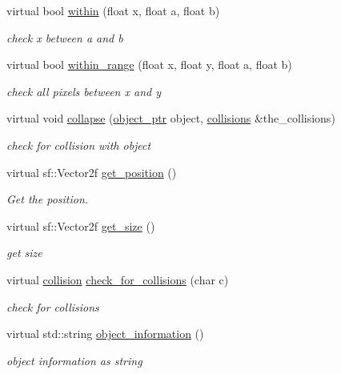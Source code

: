 \begin{DoxyCompactItemize}
virtual bool \hyperlink{classdrawable_a0d3278e4e888fc8289468e8893dd8329}{within} (float x, float a, float b)
\begin{DoxyCompactList}\small\item\em check x between a and b \end{DoxyCompactList}\item 
virtual bool \hyperlink{classdrawable_ab5c0e1af885f214bc9ef0da47cdb5ac9}{within\+\_\+range} (float x, float y, float a, float b)
\begin{DoxyCompactList}\small\item\em check all pixels between x and y \end{DoxyCompactList}\item 
virtual void \hyperlink{classdrawable_af0ddd3660d258629598dc76b31d1cc49}{collapse} (\hyperlink{typedefs_8hpp_aab5add95f06d2ba25dbfed8eb07274fa}{object\+\_\+ptr} object, \hyperlink{typedefs_8hpp_a7e1a7f34f6d09dabb4cdafd6e4118603}{collisions} \&the\+\_\+collisions)
\begin{DoxyCompactList}\small\item\em check for collision with object \end{DoxyCompactList}\item 
virtual sf\+::\+Vector2f \hyperlink{classdrawable_a6a31ea381be2964d0115b782a66d3414}{get\+\_\+position} ()
\begin{DoxyCompactList}\small\item\em Get the position. \end{DoxyCompactList}\item 
virtual sf\+::\+Vector2f \hyperlink{classdrawable_a58cb3ab0406d40e9cea3aefac1e4bf05}{get\+\_\+size} ()
\begin{DoxyCompactList}\small\item\em get size \end{DoxyCompactList}\item 
virtual \hyperlink{structcollision}{collision} \hyperlink{classdrawable_abbc6e0089d502ba48c3fcb9c96e3966e}{check\+\_\+for\+\_\+collisions} (char c)
\begin{DoxyCompactList}\small\item\em check for collisions \end{DoxyCompactList}\item 
virtual std\+::string \hyperlink{classdrawable_a2ed0f8bb53f33477f7722efa7bb24583}{object\+\_\+information} ()
\begin{DoxyCompactList}\small\item\em object information as string \end{DoxyCompactList}\item 

\end{DoxyCompactItemize}
